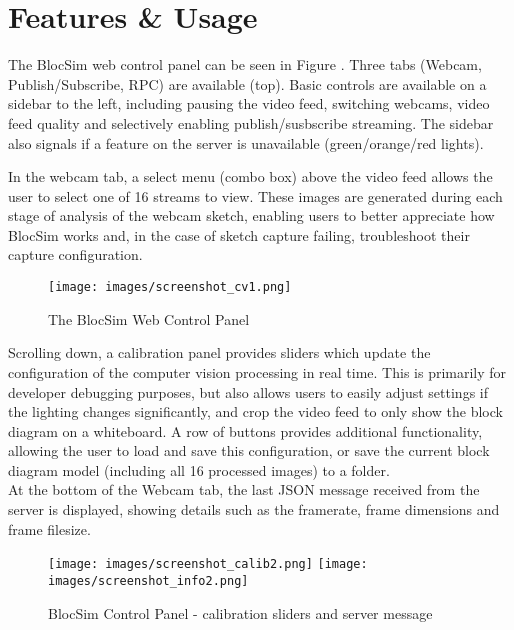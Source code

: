 \clearpage

\section{Features \& Usage}

The BlocSim web control panel can be seen in Figure \label{im:screenshot_cv1}. Three tabs (Webcam, Publish/Subscribe, RPC) are available (top). Basic controls are available on a sidebar to the left, including pausing the video feed, switching webcams, video feed quality and selectively enabling publish/susbscribe streaming. The sidebar also signals if a feature on the server is unavailable (green/orange/red lights).

In the webcam tab, a select menu (combo box) above the video feed allows the user to select one of 16 streams to view. These images are generated during each stage of analysis of the webcam sketch, enabling users to better appreciate how BlocSim works and, in the case of sketch capture failing, troubleshoot their capture configuration.
\\

\begin{figure}[ht!]
\centering
\texttt{[image: images/screenshot\_cv1.png]}
\caption{The BlocSim Web Control Panel \cite{blocsim}}
\label{im:screenshot_cv1}
\end{figure}

\newpage

Scrolling down, a calibration panel provides sliders which update the configuration of the computer vision processing in real time. This is primarily for developer debugging purposes, but also allows users to easily adjust settings if the lighting changes significantly, and crop the video feed to only show the block diagram on a whiteboard. A row of buttons provides additional functionality, allowing the user to load and save this configuration, or save the current block diagram model (including all 16 processed images) to a folder.
\\

At the bottom of the Webcam tab, the last JSON message received from the server is displayed, showing details such as the framerate, frame dimensions and frame filesize.
\\

\begin{figure}[ht!]
\centering
\texttt{[image: images/screenshot\_calib2.png]} %
\texttt{[image: images/screenshot\_info2.png]}
\caption{BlocSim Control Panel - calibration sliders and server message \cite{blocsim}}
\label{im:screenshot_calib}
\end{figure}

